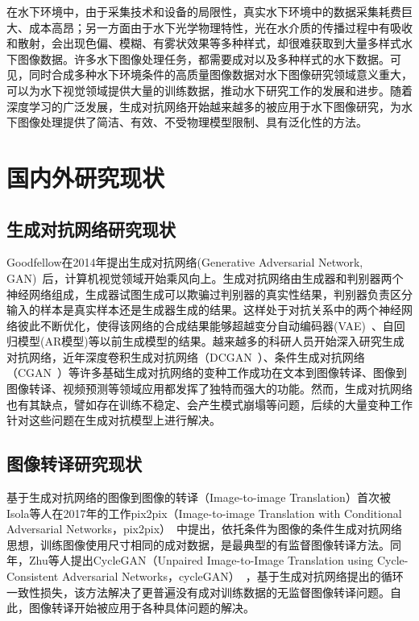 在水下环境中，由于采集技术和设备的局限性，真实水下环境中的数据采集耗费巨大、成本高昂；另一方面由于水下光学物理特性，光在水介质的传播过程中有吸收和散射，会出现色偏、模糊、有雾状效果等多种样式，却很难获取到大量多样式水下图像数据。许多水下图像处理任务，都需要成对以及多种样式的水下数据。可见，同时合成多种水下环境条件的高质量图像数据对水下图像研究领域意义重大，可以为水下视觉领域提供大量的训练数据，推动水下研究工作的发展和进步。随着深度学习的广泛发展，生成对抗网络开始越来越多的被应用于水下图像研究，为水下图像处理提供了简洁、有效、不受物理模型限制、具有泛化性的方法。


\section{国内外研究现状}
\subsection{生成对抗网络研究现状}
Goodfellow在2014年提出生成对抗网络(Generative Adversarial Network, GAN)~\cite{goodfellow2014generative}后，计算机视觉领域开始乘风向上。生成对抗网络由生成器和判别器两个神经网络组成，生成器试图生成可以欺骗过判别器的真实性结果，判别器负责区分输入的样本是真实样本还是生成器生成的结果。这样处于对抗关系中的两个神经网络彼此不断优化，使得该网络的合成结果能够超越变分自动编码器(VAE)~\cite{kingma2013auto}、自回归模型(AR模型)等以前生成模型的结果。越来越多的科研人员开始深入研究生成对抗网络，近年深度卷积生成对抗网络（DCGAN~\cite{radford2015unsupervised}）、条件生成对抗网络（CGAN~\cite{mirza2014conditional}）等许多基础生成对抗网络的变种工作成功在文本到图像转译、图像到图像转译、视频预测等领域应用都发挥了独特而强大的功能。然而，生成对抗网络也有其缺点，譬如存在训练不稳定、会产生模式崩塌等问题，后续的大量变种工作针对这些问题在生成对抗模型上进行解决。


\subsection{图像转译研究现状}
基于生成对抗网络的图像到图像的转译（Image-to-image Translation）首次被Isola等人在2017年的工作pix2pix（Image-to-image Translation with Conditional Adversarial Networks，pix2pix）~\cite{isola2017image}中提出，依托条件为图像的条件生成对抗网络思想，训练图像使用尺寸相同的成对数据，是最典型的有监督图像转译方法。同年，Zhu等人提出CycleGAN（Unpaired Image-to-Image Translation using Cycle-Consistent Adversarial Networks，cycleGAN）~\cite{zhu2017unpaired}，基于生成对抗网络提出的循环一致性损失，该方法解决了更普遍没有成对训练数据的无监督图像转译问题。自此，图像转译开始被应用于各种具体问题的解决。

